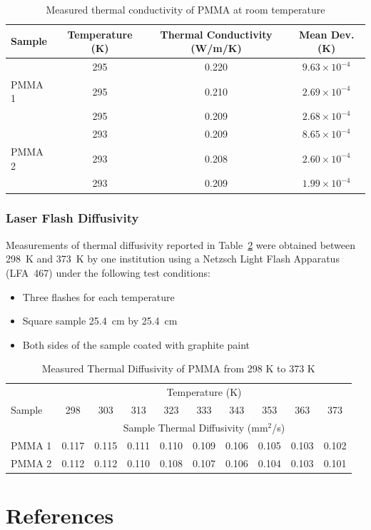 \documentclass{book}
\begin{document}
\begin{table}[ht]
\caption{Measured thermal conductivity of PMMA at room temperature}
\label{Table_14}
\begin{center}
\begin{tabular}{|l|ccc|}
\hline
Sample    & Temperature (K) & Thermal Conductivity (W/m/K) & Mean Dev. (K)        \\ \hline
          & 295             & 0.220                        & $9.63\times10^{-4}$  \\
PMMA 1    & 295             & 0.210                        & $2.69\times10^{-4}$  \\
          & 295             & 0.209                        & $2.68\times10^{-4}$  \\ \hline & 293             & 0.209                        & $8.65\times10^{-4}$  \\
PMMA 2    & 293             & 0.208                        & $2.60\times10^{-4}$  \\
          & 293             & 0.209                        & $1.99\times10^{-4}$  \\ \hline
\end{tabular}
\end{center}
\end{table}


\subsection{Laser Flash Diffusivity}

Measurements of thermal diffusivity reported in Table~\ref{Table_15} were obtained between 298~K and 373~K by one institution using a Netzsch Light Flash Apparatus (LFA~467) under the following test conditions:
\begin{itemize}
 \item Three flashes for each temperature
 \item Square sample 25.4~cm by 25.4~cm
 \item Both sides of the sample coated with graphite paint
\end{itemize}

\begin{table}[ht]
\caption{Measured Thermal Diffusivity of PMMA from 298 K to 373 K}
\label{Table_15}
\begin{center}
\begin{tabular}{|l|ccccccccc|}
\hline
        & \multicolumn{9}{|c|}{Temperature (K)}                                 \\ \cline{2-10}
Sample  & 298  & 303  & 313  & 323  & 333  & 343  & 353  & 363  & 373           \\ \cline{2-10}
        & \multicolumn{9}{|c|}{Sample Thermal Diffusivity (mm$^2$/s)}           \\ \hline
PMMA 1  & 0.117 & 0.115 & 0.111 & 0.110 & 0.109 & 0.106 & 0.105 & 0.103 & 0.102 \\
PMMA 2  & 0.112 & 0.112 & 0.110 & 0.108 & 0.107 & 0.106 & 0.104 & 0.103 & 0.101 \\ \hline
\end{tabular}
\end{center}
\end{table}




\backmatter

\chapter{References}


\end{document}
